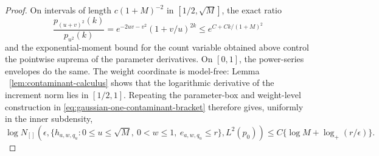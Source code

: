 \documentclass[11pt]{article}
\theoremstyle{definition}
\numberwithin{equation}{section}
\begin{document}
\begin{proof}
On intervals of length \(c(1+M)^{-2}\) in \([1/2,\sqrt M]\), the exact
ratio
\[
 \frac{p_{(u+v)^2}(k)}{p_{u^2}(k)}
 =e^{-2uv-v^2}(1+v/u)^{2k}
 \le e^{C+Ck/(1+M)^2}
\]
and the exponential-moment bound for the count variable obtained above
control the pointwise suprema of the parameter derivatives. On \([0,1]\),
the power-series envelopes do the
same. The weight coordinate is model-free: Lemma
~\ref{lem:contaminant-calculus} shows that the logarithmic derivative of
the increment norm lies in \([1/2,1]\). Repeating the parameter-box and
weight-level construction in \eqref{eq:gaussian-one-contaminant-bracket}
therefore gives, uniformly in the inner subdensity,
\begin{equation}
\label{eq:poisson-one-contaminant-bracket}
 \log N_{[]}\left(
 \epsilon,
 \{h_{a,w,q_u}:0\le u\le\sqrt M,\ 0<w\le1,\
       e_{a,w,q_u}\le r\},
 L^2(p_0)\right)
 \le C\{\log M+\log_+(r/\epsilon)\}.
\end{equation}


\end{proof}
\end{document}
